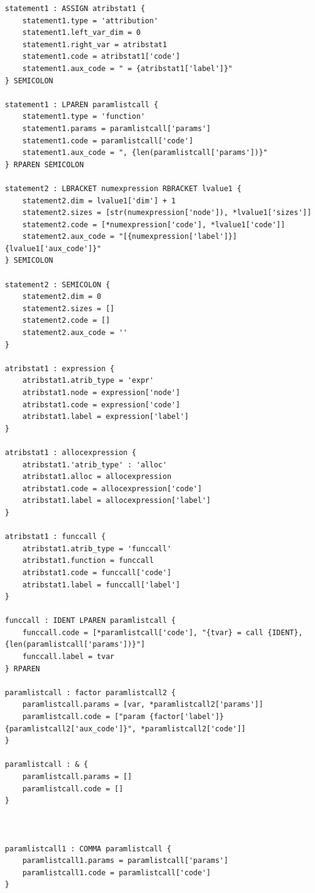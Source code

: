 \documentclass[
	12pt,				%
	openright,			%
	twoside,			%
	a4paper,			%
	english,			%
	french,				%
	spanish,			%
	brazil				%
	]{abntex2}
\begin{document}
\begin{apendicesenv}
\begin{lstlisting}
statement1 : ASSIGN atribstat1 {
    statement1.type = 'attribution'
    statement1.left_var_dim = 0
    statement1.right_var = atribstat1
    statement1.code = atribstat1['code']
    statement1.aux_code = " = {atribstat1['label']}"
} SEMICOLON

statement1 : LPAREN paramlistcall {
    statement1.type = 'function'
    statement1.params = paramlistcall['params']
    statement1.code = paramlistcall['code']
    statement1.aux_code = ", {len(paramlistcall['params'])}"
} RPAREN SEMICOLON

statement2 : LBRACKET numexpression RBRACKET lvalue1 {
    statement2.dim = lvalue1['dim'] + 1
    statement2.sizes = [str(numexpression['node']), *lvalue1['sizes']]
    statement2.code = [*numexpression['code'], *lvalue1['code']]
    statement2.aux_code = "[{numexpression['label']}]{lvalue1['aux_code']}"
} SEMICOLON

statement2 : SEMICOLON {
    statement2.dim = 0
    statement2.sizes = [] 
    statement2.code = []
    statement2.aux_code = ''
}

atribstat1 : expression {
    atribstat1.atrib_type = 'expr'
    atribstat1.node = expression['node']
    atribstat1.code = expression['code']
    atribstat1.label = expression['label']
}

atribstat1 : allocexpression {
    atribstat1.'atrib_type' : 'alloc'
    atribstat1.alloc = allocexpression
    atribstat1.code = allocexpression['code']
    atribstat1.label = allocexpression['label']
}

atribstat1 : funccall { 
    atribstat1.atrib_type = 'funccall'
    atribstat1.function = funccall
    atribstat1.code = funccall['code']
    atribstat1.label = funccall['label'] 
}

funccall : IDENT LPAREN paramlistcall {
    funccall.code = [*paramlistcall['code'], "{tvar} = call {IDENT}, {len(paramlistcall['params'])}"]
    funccall.label = tvar
} RPAREN

paramlistcall : factor paramlistcall2 {
    paramlistcall.params = [var, *paramlistcall2['params']]
    paramlistcall.code = ["param {factor['label']}{paramlistcall2['aux_code']}", *paramlistcall2['code']]
}

paramlistcall : & { 
    paramlistcall.params = []
    paramlistcall.code = [] 
}



paramlistcall1 : COMMA paramlistcall { 
    paramlistcall1.params = paramlistcall['params']
    paramlistcall1.code = paramlistcall['code'] 
}




\end{lstlisting}
\end{apendicesenv}
\end{document}
